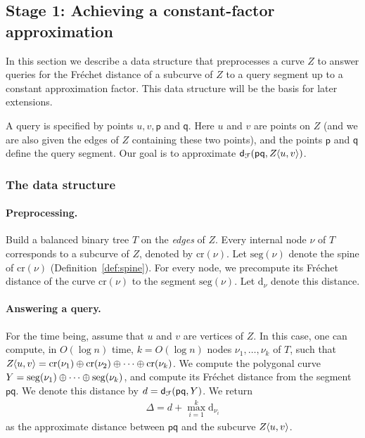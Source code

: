 \documentclass[12pt]{article}
\newcommand{\seclab}[1]{\label{sec:#1}}
\newcommand{\defref}[1]{Definition~\ref{def:#1}}
\newcommand{\ts}{\hspace{0.6pt}}
\newcommand{\Frechet}{Fr\'{e}c{h}e{}t\xspace}\providecommand{\Arr}{\mathop{\mathrm{\EuScript{A}}}}
\newcommand{\distFr}[2]{\mathsf{d}_{\EuScript{F}}\pth{#1, #2}}
\newcommand{\pnt}{\mathsf{p}}
\newcommand{\pntA}{\mathsf{q}}
\newcommand{\SimplifyX}[1]{#1}
\newcommand{\cZ}{{Z}}
\newcommand{\cY}{\SimplifyX{\cYBase}}
\providecommand{\pth}[2][\!]{#1\left({#2}\right)}
\newcommand{\concatOp}{\oplus}
\newcommand{\SC}[3]{{#1}\!\!\ts\ts \left\langle  #2, #3 \right\rangle}
\newcommand{\Tree}{T}
\newcommand{\node}{\nu}
\newcommand{\cNode}[1]{\mathrm{c{}r}\pth{#1}}
\newcommand{\segNode}[1]{\mathrm{s{e}g}\pth{#1}}
\newcommand{\frNode}[1]{\mathrm{d}_{#1}}
\numberwithin{figure}{section}
\numberwithin{equation}{section}
\begin{document}
\subsection{Stage 1: Achieving a constant-factor approximation}
\seclab{f:r:query:constant}\seclab{queries:stage:one}


In this section we describe a data structure that preprocesses a curve
$\cZ$ to answer queries for the \Frechet distance of a subcurve of
$\cZ$ to a query segment up to a constant approximation factor. This
data structure will be the basis for later extensions.

A query is specified by points $u,v, \pnt$ and $\pntA$. Here $u$ and
$v$ are points on $\cZ$ (and we are also given the edges of $\cZ$
containing these two points), and the points $\pnt$ and $\pntA$ define
the query segment. Our goal is to approximate $\distFr{ \pnt
   \pntA}{\SC{\cZ}{u}{v}}$.

\subsubsection{The data structure}

\paragraph{Preprocessing.}
Build a balanced binary tree $\Tree$ on the \emph{edges} of $\cZ$.
Every internal node $\node$ of $\Tree$ corresponds to a subcurve of
$\cZ$, denoted by $\cNode{\node}$. Let $\segNode{\node}$ denote the
spine of $\cNode{\node}$ (\defref{spine}).  For every node, we
precompute its \Frechet distance of the curve $\cNode{\node}$ to the
segment $\segNode{\node}$. Let $\frNode{\node}$ denote this distance.

\paragraph{Answering a query.}
For the time being, assume that $u$ and $v$ are vertices of $\cZ$.  In
this case, one can compute, in $O( \log n)$ time, $k=O(\log n)$ nodes
$\node_1, \ldots, \node_k$ of $\Tree$, such that $\SC{\cZ}{u}{v} =
\cNode{\node_1} \concatOp \cNode{\node_2} \concatOp \cdots \concatOp
\cNode{\node_k}$. We compute the polygonal curve $\cY =
\segNode{\node_1} \concatOp \cdots \concatOp \segNode{\node_k}$, and
compute its \Frechet distance from the segment $\pnt \pntA$. We denote
this distance by $d = \distFr{\pnt \pntA}{\cY}$. We return
\begin{align*}
    \Delta = d + \max_{i=1}^k \frNode{\node_i}
\end{align*}
as the approximate distance between {$\pnt \pntA$} and the subcurve
$\SC{\cZ}{u}{v}$.
\end{document}
